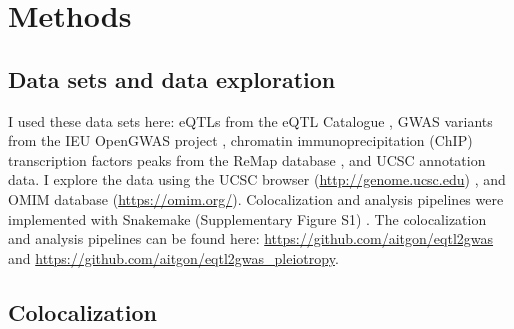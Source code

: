 %
%
%
%

\section*{Methods}\label{sec:methods}

\subsection*{Data sets and data exploration}

I used these data sets here: eQTLs from the eQTL Catalogue \citep{2021.Alasoo.Kerimov}, GWAS variants from the IEU OpenGWAS project \citep{2021.Marcora.Lyon}, chromatin immunoprecipitation (ChIP) transcription factors peaks from the ReMap database \citep{2021.Ballester.Hammal}, and UCSC annotation data.
%
I explore the data using the UCSC browser (\url{http://genome.ucsc.edu}) \citep{2021.Kent.Lee}, and OMIM database (\url{https://omim.org/}).
%
Colocalization and analysis pipelines were implemented with Snakemake (Supplementary Figure S1) .
%
The colocalization and analysis pipelines can be found here: \url{https://github.com/aitgon/eqtl2gwas} and \url{https://github.com/aitgon/eqtl2gwas_pleiotropy}.

\subsection*{Colocalization}

